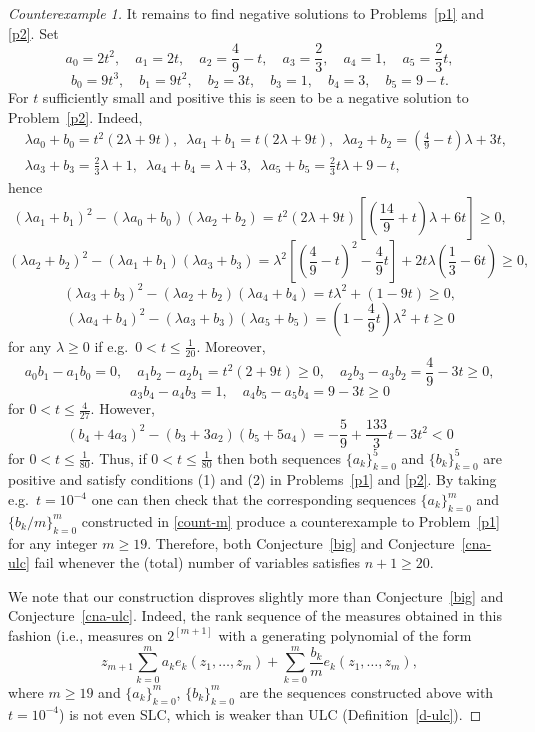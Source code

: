 \documentclass[10pt,reqno]{amsart}
\theoremstyle{plain}
\theoremstyle{definition}
\theoremstyle{remark}
\begin{document}
\begin{proof}[Counterexample 1]
It remains to find negative solutions to Problems~\ref{p1} and \ref{p2}.   
Set 
$$a_0=2t^2,\quad a_1=2t,\quad a_2=\frac{4}{9}-t,\quad a_3=\frac{2}{3},\quad 
a_4=1,\quad a_5=\frac{2}{3}t,$$
$$b_0=9t^3,\quad b_1=9t^2,\quad b_2=3t,\quad b_3=1,\quad b_4=3,\quad b_5=9-t.$$
For $t$ sufficiently small and positive this is seen to be a negative 
solution to Problem~\ref{p2}. Indeed, 
\begin{equation*}
\begin{split}
&\lambda a_0+b_0=t^2(2\lambda+9t),\,\,\, \lambda a_1+b_1=t(2\lambda+9t),
\,\,\, \lambda a_2+b_2
=\left(\frac{4}{9}-t\right)\lambda+3t,\\
&\lambda a_3+b_3=\frac{2}{3}\lambda +1,\,\,\, \lambda a_4+b_4=\lambda+3,
\,\,\, \lambda a_5+b_5
=\frac{2}{3}t\lambda+9-t,
\end{split}
\end{equation*}
hence
$$(\lambda a_1+b_1)^2-(\lambda a_0+b_0)(\lambda a_2+b_2)
=t^2(2\lambda+9t)\left[\left(\frac{14}{9}+
t\right)\lambda+6t\right]\ge 0,$$
$$(\lambda a_2+b_2)^2-(\lambda a_1+b_1)(\lambda a_3+b_3)
=\lambda^2\left[\left(\frac{4}{9}-t\right)^2
-\frac{4}{9}t\right]+2t\lambda \left(\frac{1}{3}-6t\right)\ge 0,$$
$$(\lambda a_3+b_3)^2-(\lambda a_2+b_2)(\lambda a_4+b_4)
=t\lambda^2+(1-9t)\ge 0,$$
$$(\lambda a_4+b_4)^2-(\lambda a_3+b_3)(\lambda a_5+b_5)
=\left(1-\frac{4}{9}t\right)\lambda^2
+t\ge 0$$
for any $\lambda \ge 0$ if e.g.~$0<t\le \frac{1}{20}$. Moreover,
$$a_0b_1-a_1b_0=0,\quad a_1b_2-a_2b_1=t^2(2+9t)\ge 0,\quad a_2b_3-a_3b_2=
\frac{4}{9}-3t\ge 0,$$
$$a_3b_4-a_4b_3=1,\quad a_4b_5-a_5b_4=9-3t\ge 0$$
for $0<t\le\frac{4}{27}$. However, 
$$
(b_4+4a_3)^2-(b_3+3a_2)(b_5+5a_4)= -\frac{5}{9}+\frac{133}{3}t-3t^2<0 
$$
for $0<t \leq \frac{1}{80}$. Thus, if $0<t\le \frac{1}{80}$ then both 
sequences $\{a_k\}_{k=0}^5$ and $\{b_k\}_{k=0}^5$ are positive  and satisfy 
conditions (1) and (2) in 
Problems~\ref{p1} and \ref{p2}. By taking e.g.~$t=10^{-4}$ one can then 
check that the corresponding sequences $\{a_k\}_{k=0}^m$ and 
$\{b_k/m\}_{k=0}^m$ constructed in \eqref{count-m} produce a 
counterexample to Problem~\ref{p1} for any integer $m\ge 19$. Therefore, 
both Conjecture~\ref{big} and Conjecture~\ref{cna-ulc} fail whenever the 
(total) number 
of variables satisfies $n+1\ge 20$. 

We note that our construction disproves slightly more than 
Conjecture~\ref{big} and Conjecture~\ref{cna-ulc}. Indeed, 
the rank sequence of the measures obtained in this fashion 
(i.e., measures  
on $2^{[m+1]}$ with a generating polynomial of the form 
$$
z_{m+1}\sum_{k=0}^{m}a_ke_k(z_1,\ldots,z_m)+
\sum_{k=0}^{m}\frac{b_k}{m}e_k(z_1,\ldots,z_m),
$$
where $m\ge 19$ and $\{a_k\}_{k=0}^{m}$, $\{b_k\}_{k=0}^{m}$ are 
the sequences constructed above with $t=10^{-4}$)  
is not even SLC, which is weaker than ULC (Definition~\ref{d-ulc}). 


\end{proof}
\end{document}
